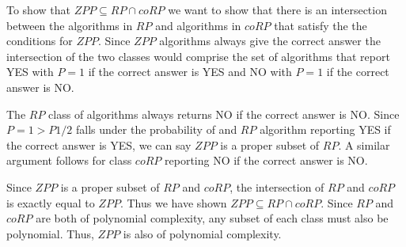 \documentclass[letterpaper, 11pt]{article}
\begin{document}
To show that $ZPP \subseteq RP \cap coRP$ we want to show that there is an intersection between the algorithms in $RP$ and algorithms in $coRP$ that satisfy the the conditions for $ZPP$. Since $ZPP$ algorithms always give the correct answer the intersection of the two classes would comprise the set of algorithms that report YES with $P=1$ if the correct answer is YES and NO with $P=1$ if the correct answer is NO.

The $RP$ class of algorithms always returns NO if the correct answer is NO. Since $P = 1 > P 1/2$ falls under the probability of and $RP$ algorithm reporting YES if the correct answer is YES, we can say $ZPP$ is a proper subset of $RP$. A similar argument follows for class $coRP$ reporting NO if the correct answer is NO.

Since $ZPP$ is a proper subset of $RP$ and $coRP$, the intersection of $RP$ and $coRP$ is exactly equal to $ZPP$. Thus we have shown $ZPP \subseteq RP \cap coRP$. Since $RP$ and $coRP$ are both of polynomial complexity, any subset of each class must also be polynomial. Thus, $ZPP$ is also of polynomial complexity.
\pagebreak
\end{document}
